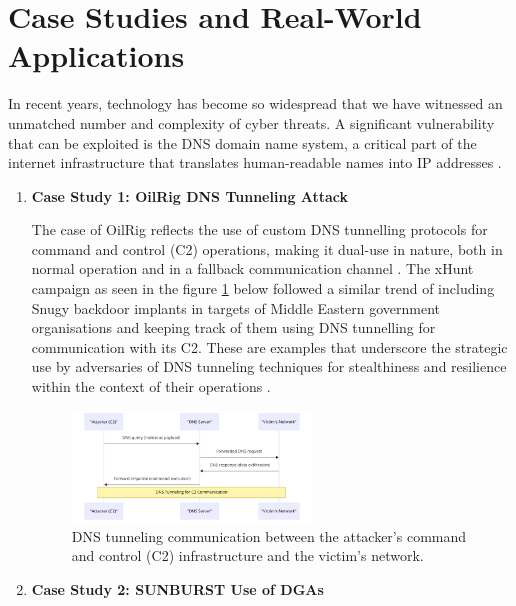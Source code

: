 \section{Case Studies and Real-World Applications}


In recent years, technology has become so widespread that we have witnessed an unmatched number and complexity of cyber threats. A significant vulnerability that can be exploited is the DNS domain name system, a critical part of the internet infrastructure that translates human-readable names into IP addresses \cite{kumari2021sac115}. 

\begin{enumerate} 

\item\textbf{ Case Study 1: OilRig DNS Tunneling Attack }

The case of OilRig reflects the use of custom DNS tunnelling protocols for command and control (C2) operations, making it dual-use in nature, both in normal operation and in a fallback communication channel \cite{paloaltonetworks2021dnsattacks}. The xHunt campaign \cite{unit42_xhunt_2021} as seen in the figure \ref{fig:figTen} below followed a similar trend of including Snugy backdoor implants in targets of Middle Eastern government organisations and keeping track of them using DNS tunnelling for communication with its C2.  These are examples that underscore the strategic use by adversaries of DNS tunneling techniques for stealthiness and resilience within the context of their operations \cite{unit42_2021}.

\captionsetup{font= footnotesize}
\begin{figure}[H]
    \centering
    \includegraphics[width=0.6\textwidth]{background/DNSTuu.png}
    \caption{DNS tunneling communication between the attacker's command and control (C2) infrastructure and the victim's network.}
    \label{fig:figTen}
\end{figure}


\vspace{25px}
\item\textbf{ Case Study 2: SUNBURST Use of DGAs}


\end{enumerate}

